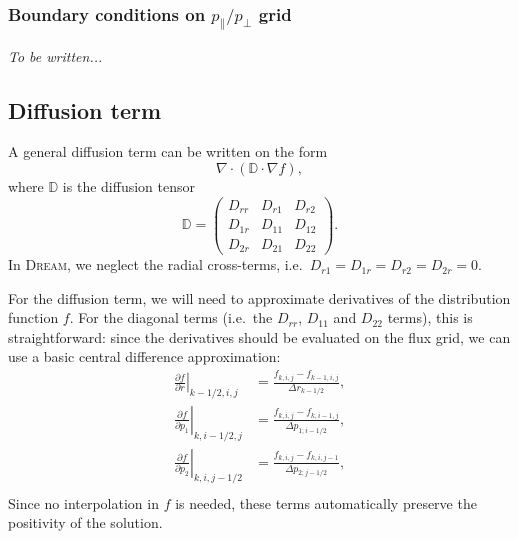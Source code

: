 \documentclass{notes}
\newcommand{\DREAM}{\textsc{Dream}}
\begin{document}
    \subsubsection{Boundary conditions on $p_\parallel / p_\perp$ grid}
    \emph{To be written...}

    \subsection{Diffusion term}\label{sec:diffusion}
    A general diffusion term can be written on the form
    \begin{equation*}
        \nabla\cdot\left( \mathbb{D}\cdot\nabla f \right),
    \end{equation*}
    where $\mathbb{D}$ is the diffusion tensor
    \begin{equation*}
        \mathbb{D} = \begin{pmatrix}
            D_{rr} & D_{r1} & D_{r2} \\
            D_{1r} & D_{11} & D_{12} \\
            D_{2r} & D_{21} & D_{22}
        \end{pmatrix}.
    \end{equation*}
    In \DREAM, we neglect the radial cross-terms, i.e.\
    $D_{r1} = D_{1r} = D_{r2} = D_{2r} = 0$.

    For the diffusion term, we will need to approximate derivatives of the
    distribution function $f$. For the diagonal terms (i.e.\ the $D_{rr}$,
    $D_{11}$ and $D_{22}$ terms), this is straightforward: since the derivatives
    should be evaluated on the flux grid, we can use a basic central difference
    approximation:
    \begin{align}
        \left.\frac{\partial f}{\partial r}\right|_{k-1/2,i,j} &=
            \frac{f_{k,i,j} - f_{k-1,i,j}}{\Delta r_{k-1/2}},\\
        \left.\frac{\partial f}{\partial p_1}\right|_{k,i-1/2,j} &=
            \frac{f_{k,i,j} - f_{k,i-1,j}}{\Delta p_{1; i-1/2}},\\
        \left.\frac{\partial f}{\partial p_2}\right|_{k,i,j-1/2} &=
            \frac{f_{k,i,j} - f_{k,i,j-1}}{\Delta p_{2; j-1/2}},\\
    \end{align}
    Since no interpolation in $f$ is needed, these terms automatically preserve
    the positivity of the solution.
\end{document}
